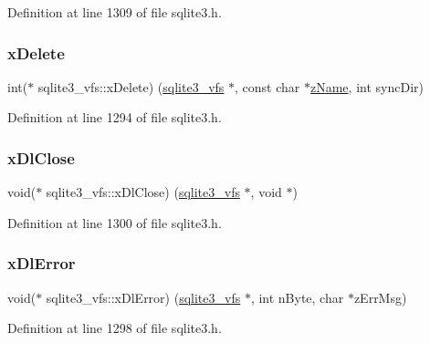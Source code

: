 Definition at line 1309 of file sqlite3.\+h.

\mbox{\label{structsqlite3__vfs_a9a84baca80b7ab2da9fb147cb40c73d2}} 
\subsubsection{\texorpdfstring{x\+Delete}{xDelete}}
{\footnotesize\ttfamily int($\ast$ sqlite3\+\_\+vfs\+::x\+Delete) (\mbox{\hyperlink{structsqlite3__vfs}{sqlite3\+\_\+vfs}} $\ast$, const char $\ast$\mbox{\hyperlink{structsqlite3__vfs_a0f06a27ac2201ea04c0623ef19e5d73e}{z\+Name}}, int sync\+Dir)}



Definition at line 1294 of file sqlite3.\+h.

\mbox{\label{structsqlite3__vfs_a0cbdab1584e0e2a80b32b2c335f17f99}} 
\subsubsection{\texorpdfstring{x\+Dl\+Close}{xDlClose}}
{\footnotesize\ttfamily void($\ast$ sqlite3\+\_\+vfs\+::x\+Dl\+Close) (\mbox{\hyperlink{structsqlite3__vfs}{sqlite3\+\_\+vfs}} $\ast$, void $\ast$)}



Definition at line 1300 of file sqlite3.\+h.

\mbox{\label{structsqlite3__vfs_ace296f3efa5d1a490c892069891f37c0}} 
\subsubsection{\texorpdfstring{x\+Dl\+Error}{xDlError}}
{\footnotesize\ttfamily void($\ast$ sqlite3\+\_\+vfs\+::x\+Dl\+Error) (\mbox{\hyperlink{structsqlite3__vfs}{sqlite3\+\_\+vfs}} $\ast$, int n\+Byte, char $\ast$z\+Err\+Msg)}



Definition at line 1298 of file sqlite3.\+h.


